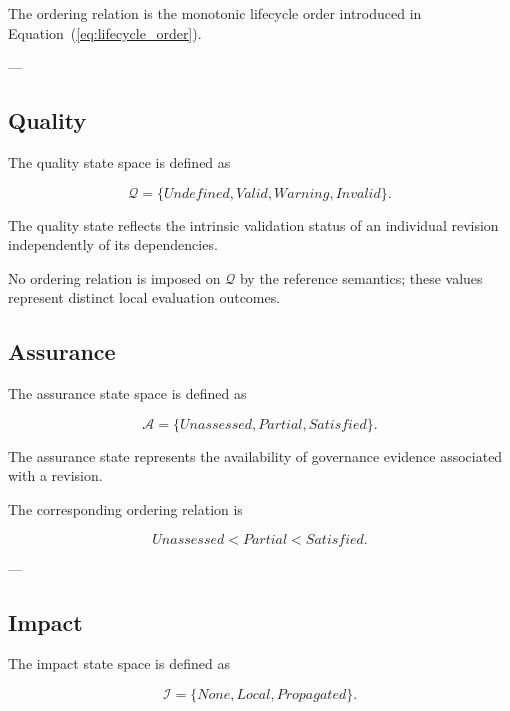 \documentclass[10pt]{article}
\begin{document}
The ordering relation is the monotonic lifecycle order introduced in Equation~(\ref{eq:lifecycle_order}).

---

\subsection{Quality}

The quality state space is defined as

\begin{equation}
	\mathcal{Q}=
	\{
	Undefined,
	Valid,
	Warning,
	Invalid
	\}.
	\label{eq:quality_space}
\end{equation}

The quality state reflects the intrinsic validation status of an individual revision independently of its dependencies.

No ordering relation is imposed on $\mathcal{Q}$ by the reference semantics; these values represent distinct local evaluation outcomes.

\subsection{Assurance}

The assurance state space is defined as

\begin{equation}
	\mathcal{A}=
	\{
	Unassessed,
	Partial,
	Satisfied
	\}.
	\label{eq:assurance_space}
\end{equation}

The assurance state represents the availability of governance evidence associated with a revision.

The corresponding ordering relation is

\begin{equation}
	Unassessed
	<
	Partial
	<
	Satisfied.
	\label{eq:assurance_order}
\end{equation}

---

\subsection{Impact}

The impact state space is defined as

\begin{equation}
	\mathcal{I}=
	\{
	None,
	Local,
	Propagated
	\}.
	\label{eq:impact_space}
\end{equation}
\end{document}
